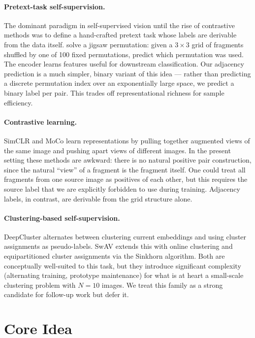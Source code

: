 \documentclass[12pt, a4paper]{article}
\begin{document}
\paragraph{Pretext-task self-supervision.}
The dominant paradigm in self-supervised vision until the rise of contrastive methods
was to define a hand-crafted pretext task whose labels are derivable from the data
itself. \textcite{noroozi2016} solve a jigsaw permutation: given a $3 \times 3$ grid
of fragments shuffled by one of 100 fixed permutations, predict which permutation was
used. The encoder learns features useful for downstream classification. Our adjacency
prediction is a much simpler, binary variant of this idea --- rather than predicting
a discrete permutation index over an exponentially large space, we predict a binary
label per pair. This trades off representational richness for sample efficiency.

\paragraph{Contrastive learning.}
SimCLR \parencite{simclr2020} and MoCo \parencite{moco2020} learn representations by
pulling together augmented views of the same image and pushing apart views of
different images. In the present setting these methods are awkward: there is no
natural positive pair construction, since the natural ``view'' of a fragment is the
fragment itself. One could treat all fragments from one source image as positives
of each other, but this requires the source label that we are explicitly forbidden
to use during training. Adjacency labels, in contrast, are derivable from the grid
structure alone.

\paragraph{Clustering-based self-supervision.}
DeepCluster \parencite{deepcluster2018} alternates between clustering current
embeddings and using cluster assignments as pseudo-labels. SwAV
\parencite{swav2020} extends this with online clustering and equipartitioned cluster
assignments via the Sinkhorn algorithm. Both are conceptually well-suited to this
task, but they introduce significant complexity (alternating training, prototype
maintenance) for what is at heart a small-scale clustering problem with $N = 10$
images. We treat this family as a strong candidate for follow-up work but defer it.

\section{Core Idea}
\end{document}
